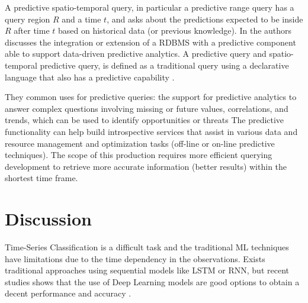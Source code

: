 A predictive spatio-temporal query, in particular a predictive range query has a query region $R$ and a time $t$, and asks about the predictions expected to be inside $R$ after time $t$ based on historical data (or previous knowledge).  In \cite{Akdere2011} the authors discusses the integration or extension of a RDBMS with a predictive component able to support data-driven predictive analytics. A predictive query and spatio-temporal predictive query, is defined as a traditional query using a declarative language that also has a predictive capability \cite{Hendawi2012}. 

They common uses for predictive queries: the support for predictive analytics to answer complex questions involving missing or future values, correlations, and trends, which  can be used to identify opportunities or threats 
The predictive functionality can help build introspective services that assist in various data and resource management and optimization tasks (off-line or on-line predictive techniques). 
The  scope  of  this  production requires  more  efficient  querying development to  retrieve more accurate  information (better results)  within  the  shortest time  frame.


%
%
\section{Discussion}
Time-Series Classification is a difficult task and the traditional ML techniques have limitations due to the time dependency in the observations. Exists traditional approaches using sequential models like LSTM or RNN, but recent studies shows that the use of Deep Learning models are good options to obtain a decent performance and accuracy \cite{Fawaz2019}. 
